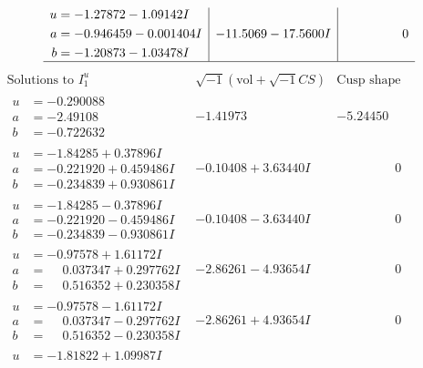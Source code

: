 \documentclass[1p]{elsarticle_modified}
\theoremstyle{definition}
\newcommand{\I}{\sqrt{-1}}
\begin{document}
$$\begin{array}{c|c|c}
\begin{aligned}
u &= -1.27872 - 1.09142 I \\
a &= -0.946459 - 0.001404 I \\
b &= -1.20873 - 1.03478 I\end{aligned}
 & -11.5069 - 17.5600 I & \phantom{-0.000000 } 0\\
 \hline 
 \end{array}$$\newpage$$\begin{array}{c|c|c}  
\text{Solutions to }I^u_{1}& \I (\text{vol} + \sqrt{-1}CS) & \text{Cusp shape}\\
 \hline 
\begin{aligned}
u &= -0.290088\phantom{ +0.000000I} \\
a &= -2.49108\phantom{ +0.000000I} \\
b &= -0.722632\phantom{ +0.000000I}\end{aligned}
 & -1.41973\phantom{ +0.000000I} & -5.24450\phantom{ +0.000000I} \\ \hline\begin{aligned}
u &= -1.84285 + 0.37896 I \\
a &= -0.221920 + 0.459486 I \\
b &= -0.234839 + 0.930861 I\end{aligned}
 & -0.10408 + 3.63440 I & \phantom{-0.000000 } 0 \\ \hline\begin{aligned}
u &= -1.84285 - 0.37896 I \\
a &= -0.221920 - 0.459486 I \\
b &= -0.234839 - 0.930861 I\end{aligned}
 & -0.10408 - 3.63440 I & \phantom{-0.000000 } 0 \\ \hline\begin{aligned}
u &= -0.97578 + 1.61172 I \\
a &= \phantom{-}0.037347 + 0.297762 I \\
b &= \phantom{-}0.516352 + 0.230358 I\end{aligned}
 & -2.86261 - 4.93654 I & \phantom{-0.000000 } 0 \\ \hline\begin{aligned}
u &= -0.97578 - 1.61172 I \\
a &= \phantom{-}0.037347 - 0.297762 I \\
b &= \phantom{-}0.516352 - 0.230358 I\end{aligned}
 & -2.86261 + 4.93654 I & \phantom{-0.000000 } 0 \\ \hline\begin{aligned}
u &= -1.81822 + 1.09987 I \\

\end{aligned}
\end{array}$$
\end{document}
